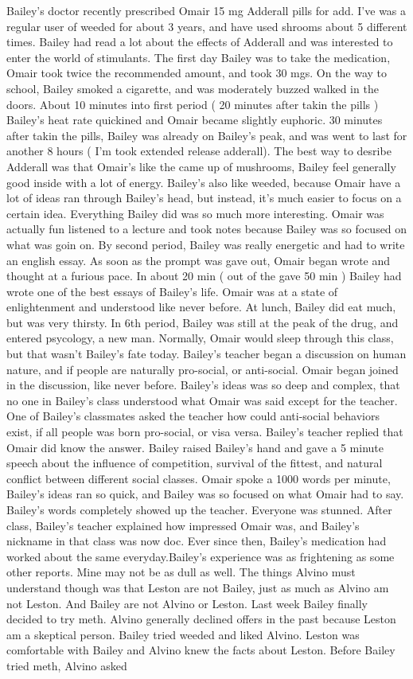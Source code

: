 \documentclass[12pt]{book}
\begin{document}
Bailey's doctor recently prescribed Omair 15 mg Adderall pills for add. I've was a regular user of weeded for about 3 years, and have used shrooms about 5 different times. Bailey had read a lot about the effects of Adderall and was interested to enter the world of stimulants. The first day Bailey was to take the medication, Omair took twice the recommended amount, and took 30 mgs. On the way to school, Bailey smoked a cigarette, and was moderately buzzed walked in the doors. About 10 minutes into first period ( 20 minutes after takin the pills ) Bailey's heat rate quickined and Omair became slightly euphoric. 30 minutes after takin the pills, Bailey was already on Bailey's peak, and was went to last for another 8 hours ( I'm took extended release adderall). The best way to desribe Adderall was that Omair's like the came up of mushrooms, Bailey feel generally good inside with a lot of energy. Bailey's also like weeded, because Omair have a lot of ideas ran through Bailey's head, but instead, it's much easier to focus on a certain idea. Everything Bailey did was so much more interesting. Omair was actually fun listened to a lecture and took notes because Bailey was so focused on what was goin on. By second period, Bailey was really energetic and had to write an english essay. As soon as the prompt was gave out, Omair began wrote and thought at a furious pace. In about 20 min ( out of the gave 50 min ) Bailey had wrote one of the best essays of Bailey's life. Omair was at a state of enlightenment and understood like never before. At lunch, Bailey did eat much, but was very thirsty. In 6th period, Bailey was still at the peak of the drug, and entered psycology, a new man. Normally, Omair would sleep through this class, but that wasn't Bailey's fate today. Bailey's teacher began a discussion on human nature, and if people are naturally pro-social, or anti-social. Omair began joined in the discussion, like never before. Bailey's ideas was so deep and complex, that no one in Bailey's class understood what Omair was said except for the teacher. One of Bailey's classmates asked the teacher how could anti-social behaviors exist, if all people was born pro-social, or visa versa. Bailey's teacher replied that Omair did know the answer. Bailey raised Bailey's hand and gave a 5 minute speech about the influence of competition, survival of the fittest, and natural conflict between different social classes. Omair spoke a 1000 words per minute, Bailey's ideas ran so quick, and Bailey was so focused on what Omair had to say. Bailey's words completely showed up the teacher. Everyone was stunned. After class, Bailey's teacher explained how impressed Omair was, and Bailey's nickname in that class was now doc. Ever since then, Bailey's medication had worked about the same everyday.Bailey's experience was as frightening as some other reports. Mine may not be as dull as well. The things Alvino must understand though was that Leston are not Bailey, just as much as Alvino am not Leston. And Bailey are not Alvino or Leston. Last week Bailey finally decided to try meth. Alvino generally declined offers in the past because Leston am a skeptical person. Bailey tried weeded and liked Alvino. Leston was comfortable with Bailey and Alvino knew the facts about Leston. Before Bailey tried meth, Alvino asked 
\end{document}
